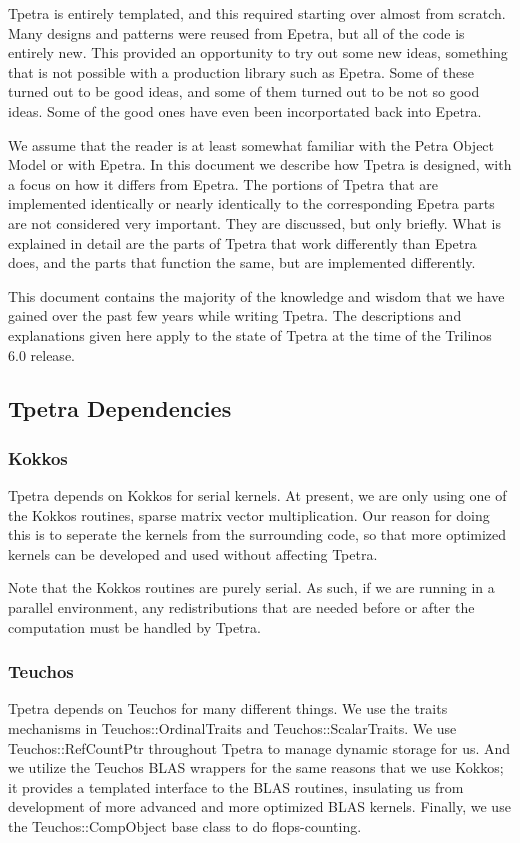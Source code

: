 \documentclass[10pt,relax]{TpetraDesign}
\begin{document}
Tpetra is entirely templated, and this required starting over almost from scratch. Many designs and patterns were reused from Epetra, but all of the code is entirely new. This provided an opportunity to try out some new ideas, something that is not possible with a production library such as Epetra. Some of these turned out to be good ideas, and some of them turned out to be not so good ideas. Some of the good ones have even been incorportated back into Epetra.

We assume that the reader is at least somewhat familiar with the Petra Object Model or with Epetra. In this document we describe how Tpetra is designed, with a focus on how it differs from Epetra. The portions of Tpetra that are implemented identically or nearly identically to the corresponding Epetra parts are not considered very important. They are discussed, but only briefly. What is explained in detail are the parts of Tpetra that work differently than Epetra does, and the parts that function the same, but are implemented differently.

This document contains the majority of the knowledge and wisdom that we have gained over the past few years while writing Tpetra. The descriptions and explanations given here apply to the state of Tpetra at the time of the Trilinos 6.0 release.

%
\subsection{Tpetra Dependencies}

\subsubsection*{Kokkos}
Tpetra depends on Kokkos \cite{Kokkos} for serial kernels. At present, we are only using one of the Kokkos routines, sparse matrix vector multiplication. Our reason for doing this is to seperate the kernels from the surrounding code, so that more optimized kernels can be developed and used without affecting Tpetra.

Note that the Kokkos routines are purely serial. As such, if we are running in a parallel environment, any redistributions that are needed before or after the computation must be handled by Tpetra.

\subsubsection*{Teuchos}
Tpetra depends on Teuchos \cite{Teuchos} for many different things. We use the traits mechanisms in Teuchos::OrdinalTraits and Teuchos::ScalarTraits. We use Teuchos::RefCountPtr \cite{RefCountPtr} throughout Tpetra to manage dynamic storage for us. And we utilize the Teuchos BLAS wrappers for the same reasons that we use Kokkos; it provides a templated interface to the BLAS routines, insulating us from development of more advanced and more optimized BLAS kernels. Finally, we use the Teuchos::CompObject base class to do flops-counting.
\end{document}
